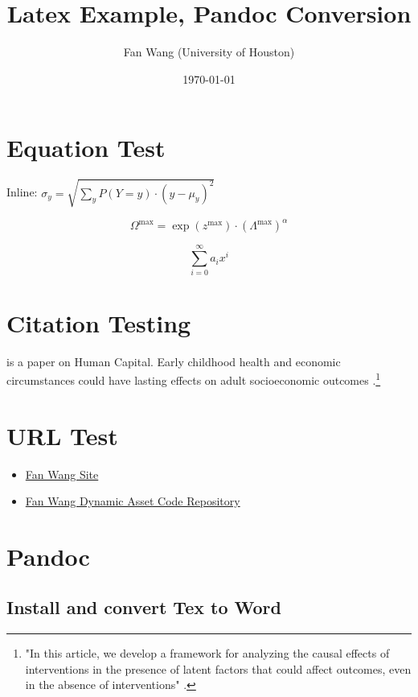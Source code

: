\documentclass[12pt,english]{article}
\title{Latex Example, Pandoc Conversion}
\author{Fan Wang (University of Houston)}
\date{\today}
\begin{document}
\maketitle

\section{Equation Test}

Inline: $\sigma_y = \sqrt{ \sum_{y} P(Y=y) \cdot \left( y - \mu_y \right)^2}$

$$\Omega^{\max} = \exp(z^{\max}) \cdot \left(\Lambda^{\max}\right)^{\alpha}$$

\begin{equation}
\label{eq:1}
\sum_{i=0}^{\infty} a_i x^i
\end{equation}

\section{Citation Testing}

\textcite{becker_human_1986} is a paper on Human Capital. Early childhood health and economic circumstances could have lasting effects on adult socioeconomic outcomes \autocite{case_lasting_2005}.\footnote{"In this article, we develop a framework for analyzing the causal effects of interventions in the presence of latent factors that could affect outcomes, even in the absence of interventions" \autocite{conti_understanding_2010}.}

\section{URL Test}

\begin{itemize}
	\item \href{http://fanwangecon.github.io}{Fan Wang Site}
	\item \href{https://fanwangecon.github.io/CodeDynaAsset/}{Fan Wang Dynamic Asset Code Repository}
\end{itemize}


\pagebreak

\section{Pandoc}

\subsection{Install and convert Tex to Word}
\end{document}

